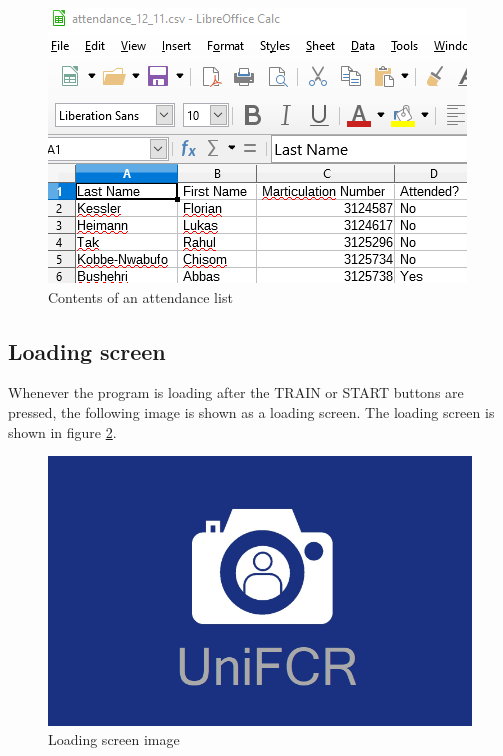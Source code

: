 \documentclass[12pt, a4paper]{article}
\begin{document}
\begin{figure}[h!]
\begin{center}
	\centering
		\includegraphics[width=1.0\columnwidth]{images/csv}
	\caption{Contents of an attendance list}
	\label{fig:csv}
\end{center}
\end{figure}
\subsection{Loading screen}
Whenever the program is loading after the TRAIN or START buttons are pressed, the following image is shown as a loading screen. The loading screen is shown in figure \ref{fig:load}.
\begin{figure}[h!]
\begin{center}
	\centering
		\includegraphics[width=1.0\columnwidth]{images/load}
	\caption{Loading screen image}
	\label{fig:load}
\end{center}
\end{figure}
\end{document}
